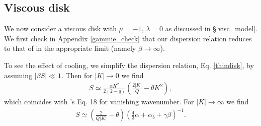 %

\subsection{Viscous disk}\label{2dvisc}
We now consider a viscous disk with 
$\mu=-1,\,\lambda=0$ as discussed in \S\ref{visc_model}. We first
check in Appendix \ref{gammie_check} that our dispersion relation
reduces to that of \cite{gammie96} in the appropriate limit (namely
$\beta\to\infty$).  

To see the effect of cooling, we simplify the dispersion relation,
Eq. \ref{thindisk}, by assuming $|\beta S|\ll 1$. Then  
for $|K| \to 0$ we find
\begin{align}\label{gammie_smallk}
  S\simeq \frac{\alpha K^2}{2(2-q)}\left(\frac{2|K|}{Q} - \theta
  K^2\right), 
\end{align}
which coincides with \citeauthor{gammie96}'s Eq. 18 for vanishing
wavenumber. For $|K|\to\infty$ we find
\begin{align}\label{gammie_bigk}
  S \simeq\left(\frac{2}{Q|K|} - \theta\right)\left(\frac{4}{3}\alpha + 
  \alpha_b + \gamma\beta\right)^{-1}.
\end{align}



